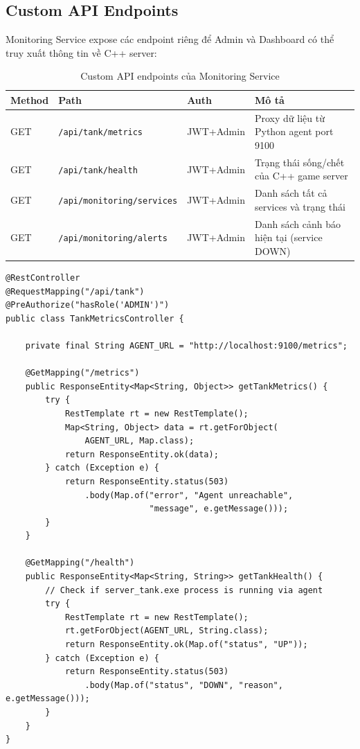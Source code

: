 \documentclass[12pt,a4paper]{report}
\begin{document}
\subsection{Custom API Endpoints}

Monitoring Service expose các endpoint riêng để Admin và Dashboard có thể truy xuất thông tin về C++ server:

\begin{table}[H]
\centering
\caption{Custom API endpoints của Monitoring Service}
\label{tab:monapi}
\begin{tabularx}{\textwidth}{lllX}
\toprule
\textbf{Method} & \textbf{Path} & \textbf{Auth} & \textbf{Mô tả} \\
\midrule
GET & \texttt{/api/tank/metrics} & JWT+Admin & Proxy dữ liệu từ Python agent port 9100 \\
GET & \texttt{/api/tank/health}  & JWT+Admin & Trạng thái sống/chết của C++ game server \\
GET & \texttt{/api/monitoring/services} & JWT+Admin & Danh sách tất cả services và trạng thái \\
GET & \texttt{/api/monitoring/alerts}   & JWT+Admin & Danh sách cảnh báo hiện tại (service DOWN) \\
\bottomrule
\end{tabularx}
\end{table}

\begin{lstlisting}[style=javaStyle, caption={Controller proxy metrics từ Python agent}, label={lst:tankcontroller}]
@RestController
@RequestMapping("/api/tank")
@PreAuthorize("hasRole('ADMIN')")
public class TankMetricsController {

    private final String AGENT_URL = "http://localhost:9100/metrics";

    @GetMapping("/metrics")
    public ResponseEntity<Map<String, Object>> getTankMetrics() {
        try {
            RestTemplate rt = new RestTemplate();
            Map<String, Object> data = rt.getForObject(
                AGENT_URL, Map.class);
            return ResponseEntity.ok(data);
        } catch (Exception e) {
            return ResponseEntity.status(503)
                .body(Map.of("error", "Agent unreachable",
                             "message", e.getMessage()));
        }
    }

    @GetMapping("/health")
    public ResponseEntity<Map<String, String>> getTankHealth() {
        // Check if server_tank.exe process is running via agent
        try {
            RestTemplate rt = new RestTemplate();
            rt.getForObject(AGENT_URL, String.class);
            return ResponseEntity.ok(Map.of("status", "UP"));
        } catch (Exception e) {
            return ResponseEntity.status(503)
                .body(Map.of("status", "DOWN", "reason", e.getMessage()));
        }
    }
}
\end{lstlisting}
\end{document}
